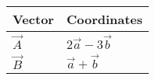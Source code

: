 \begin{tabular}{|m{5em}|m{10em}|}
    \hline
    \textbf{Vector} &\textbf{Coordinates} \\
    \hline
         $\vec{A}$ & $2\vec{a}-3\vec{b}$ \\
    \hline
        $\vec{B}$ & $\vec{a}+\vec{b}$ \\
    \hline
\end{tabular}
